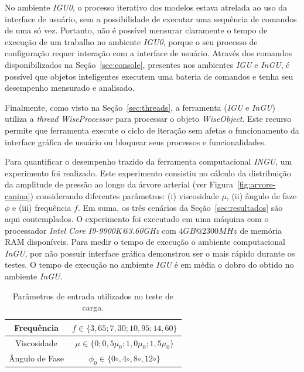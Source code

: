 No ambiente \textit{IGU0}, o processo iterativo dos modelos estava atrelada ao uso da interface de usuário, sem a possibilidade de executar uma sequência de comandos de uma só vez. Portanto, não é possível mensurar claramente o tempo de execução de um trabalho no ambiente \textit{IGU0}, porque o seu processo de configuração requer interação com a interface de usuário. Através dos comandos disponibilizados na Seção~\ref{sec:console}, presentes nos ambientes \textit{IGU} e \textit{InGU}, é possível que objetos inteligentes executem uma bateria de comandos e tenha seu desempenho mensurado e analisado.

Finalmente, como visto na Seção~\ref{sec:threads}, a ferramenta (\textit{IGU} e \textit{InGU}) utiliza a \textit{thread} \textit{WiseProcessor} para processar o objeto \textit{WiseObject}. Este recurso permite que ferramenta execute o ciclo de iteração sem afetas o funcionamento da interface gráfica de usuário ou bloquear seus processos e funcionalidades.

Para quantificar o desempenho trazido da ferramenta computacional \textit{INGU}, um experimento foi realizado. Este experimento consistiu no cálculo da distribuição da amplitude de pressão ao longo da árvore arterial (ver Figura~\ref{fig:arvore-canina}) considerando diferentes parâmetros: (i) viscosidade $\mu$, (ii) ângulo de faze $\phi$ e (iii) frequência $f$. Em suma, os três cenários da Seção~\ref{sec:resultados} são aqui contemplados. O experimento foi executado em uma máquina com o processador \textit{Intel Core I9-9900K@3.60GHz} com $4GB@2300MHz$ de memória RAM disponíveis. Para medir o tempo de execução o ambiente computacional \textit{InGU}, por não possuir interface gráfica demonstrou ser o mais rápido durante os testes. O tempo de execução no ambiente \textit{IGU} é em média o dobro do obtido no ambiente \textit{InGU}.

\begin{table}[!htbp]
	\caption{Parâmetros de entrada utilizados no teste de carga.}
	\centering{}
	\begin{tabular}{c|c}
		\toprule 
		Frequência	& $f \in \{3,65;7,30;10,95;14,60\}$  \\
		\midrule 
		Viscosidade	& $\mu \in \{0;0,5\mu_0;1,0\mu_0;1,5\mu_0\}$    \\ 
		\midrule 
		Ângulo de Fase	& $\phi_0 \in \{0{\circ},4{\circ},8{\circ},12{\circ}\}$  \\ 
		\bottomrule 
	\end{tabular} 
	\label{tab1:entrada}
\end{table}

